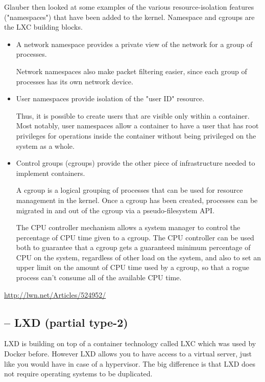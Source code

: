 Glauber then looked at some examples of the various resource-isolation features
("namespaces") that have been added to the kernel.  Namespace and cgroups are
the LXC building blocks.
\begin{itemize}
  \item  A network namespace provides a private view of the network for a group
  of processes. 
  
  Network namespaces also make packet filtering easier, since each group of
  processes has its own network device.

  \item User namespaces provide isolation of the "user ID" resource.
  
  Thus, it is possible to create users that are visible only within a container.
    Most notably, user namespaces allow a container to have a user that has root
    privileges for operations inside the container without being privileged on
    the system as a whole.   
  \item Control groups (cgroups) provide the other piece of infrastructure
  needed to implement containers.
  
  A cgroup is a logical grouping of processes that can be used for resource
  management in the kernel. Once a cgroup has been created, processes can be
  migrated in and out of the cgroup via a pseudo-filesystem API.
  
  The CPU controller mechanism allows a system manager to control the percentage
     of CPU time given to a cgroup. The CPU controller can be used both to
     guarantee that a cgroup gets a guaranteed minimum percentage of CPU on the
     system, regardless of other load on the system, and also to set an upper
     limit on the amount of CPU time used by a cgroup, so that a rogue process
     can't consume all of the available CPU time.
\end{itemize}
\url{http://lwn.net/Articles/524952/}


\subsection{-- LXD (partial type-2)}
\label{sec:LXD}


LXD is building on top of a container technology called LXC which was used by
Docker before. However LXD allows you to have access to a virtual server, just
like you would have in case of a hypervisor. The big difference is that LXD does
not require operating systems to be duplicated.

